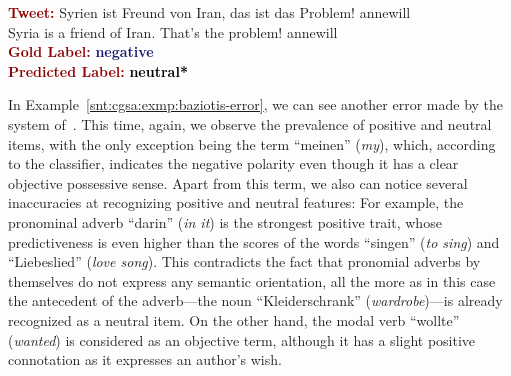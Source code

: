 \begin{example}\label{snt:cgsa:exmp:severyn-error}
  \noindent\textup{\bfseries\textcolor{darkred}{Tweet:}} {\upshape
    \colorbox{white!7.4}{Syrien} \colorbox{green!8}{ist}
    \colorbox{green!11}{Freund} \colorbox{white!6.6}{von}
    \colorbox{white!40.5}{Iran}, das \colorbox{green!8}{ist}
    \colorbox{white!12.7}{das}
    \colorbox{green!1.5}{Problem}\colorbox{green!3}{!}
    \colorbox{blue!0.000005!white!8}{annewill}}\\
  \noindent \colorbox{white!7.4}{Syria} \colorbox{green!8}{is} a \colorbox{green!11}{friend} \colorbox{white!6.6}{of} \colorbox{white!40.5}{Iran}. That\colorbox{green!8}{'s} \colorbox{white!12.7}{the} \colorbox{green!1.5}{problem}\colorbox{green!3}{!} \colorbox{blue!0.000005!white!8}{annewill}\\[\exampleSep]
  \noindent\textup{\bfseries\textcolor{darkred}{Gold Label:}}\hspace*{4.3em}\textbf{%
    \upshape\textcolor{midnightblue}{negative}}\\
 \noindent\textup{\bfseries\textcolor{darkred}{Predicted Label:}}\hspace*{2em}\textbf{%
    \upshape\textcolor{black}{neutral*}}
\end{example}

In Example~\ref{snt:cgsa:exmp:baziotis-error}, we can see another
error made by the system of~\citet{Baziotis:17}.  This time, again, we
observe the prevalence of positive and neutral items, with the only
exception being the term ``meinen'' (\emph{my}), which, according to
the classifier, indicates the negative polarity even though it has a
clear objective possessive sense.  Apart from this term, we also can
notice several inaccuracies at recognizing positive and neutral
features: For example, the pronominal adverb ``darin'' (\emph{in it})
is the strongest positive trait, whose predictiveness is even higher
than the scores of the words ``singen'' (\emph{to sing}) and
``Liebeslied'' (\emph{love song}).  This contradicts the fact that
pronomial adverbs by themselves do not express any semantic
orientation, all the more as in this case the antecedent of the
adverb---the noun ``Kleiderschrank'' (\emph{wardrobe})---is already
recognized as a neutral item.  On the other hand, the modal verb
``wollte'' (\emph{wanted}) is considered as an objective term,
although it has a slight positive connotation as it expresses an
author's wish.

